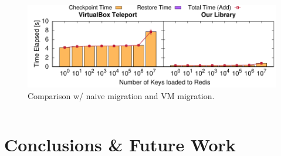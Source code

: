 \documentclass[9pt,    %
    english,            %
    xcolor=table,       %
    envcountsect,        %
    aspectratio=169     %
]{beamer}
\begin{document}
\begin{frame}
\begin{columns}
\begin{column}{.5\textwidth}
\begin{figure}
                \includegraphics[width=\textwidth]{./figs/vm_teleport.pdf}
                \caption{Comparison w/ naive migration and VM migration.\label{fig:tcp-microbecnhmark}}
            \end{figure}
        \end{column}
    \end{columns}
    
\end{frame}

\section{Conclusions \& Future Work}
\end{document}
